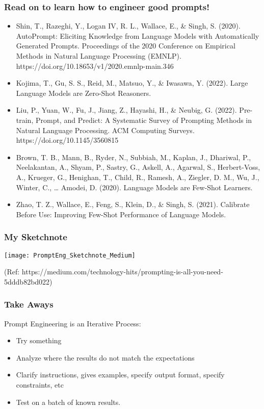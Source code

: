 \begin{frame}[fragile]\frametitle{Read on to learn how to engineer good prompts!}

\begin{itemize}
\item Shin, T., Razeghi, Y., Logan IV, R. L., Wallace, E., \& Singh, S. (2020). AutoPrompt: Eliciting Knowledge from Language Models with Automatically Generated Prompts. Proceedings of the 2020 Conference on Empirical Methods in Natural Language Processing (EMNLP). https://doi.org/10.18653/v1/2020.emnlp-main.346 
\item Kojima, T., Gu, S. S., Reid, M., Matsuo, Y., \& Iwasawa, Y. (2022). Large Language Models are Zero-Shot Reasoners. 
\item Liu, P., Yuan, W., Fu, J., Jiang, Z., Hayashi, H., \& Neubig, G. (2022). Pre-train, Prompt, and Predict: A Systematic Survey of Prompting Methods in Natural Language Processing. ACM Computing Surveys. https://doi.org/10.1145/3560815 
\item Brown, T. B., Mann, B., Ryder, N., Subbiah, M., Kaplan, J., Dhariwal, P., Neelakantan, A., Shyam, P., Sastry, G., Askell, A., Agarwal, S., Herbert-Voss, A., Krueger, G., Henighan, T., Child, R., Ramesh, A., Ziegler, D. M., Wu, J., Winter, C., … Amodei, D. (2020). Language Models are Few-Shot Learners. 
\item Zhao, T. Z., Wallace, E., Feng, S., Klein, D., \& Singh, S. (2021). Calibrate Before Use: Improving Few-Shot Performance of Language Models.
\end{itemize}
\end{frame}



\begin{frame}[fragile]\frametitle{My Sketchnote}

\begin{center}
\texttt{[image: PromptEng\_Sketchnote\_Medium]}

{\tiny (Ref: https://medium.com/technology-hits/prompting-is-all-you-need-5dddb82bd022)}
\end{center}		

\end{frame}


\begin{frame}[fragile]\frametitle{Take Aways}

Prompt Engineering is an Iterative Process:

\begin{itemize}
\item Try something
\item Analyze where the results do not match the expectations
\item Clarify instructions, gives examples, specify output format, specify constraints, etc
\item Test on a batch of known results.
\end{itemize}
\end{frame}


